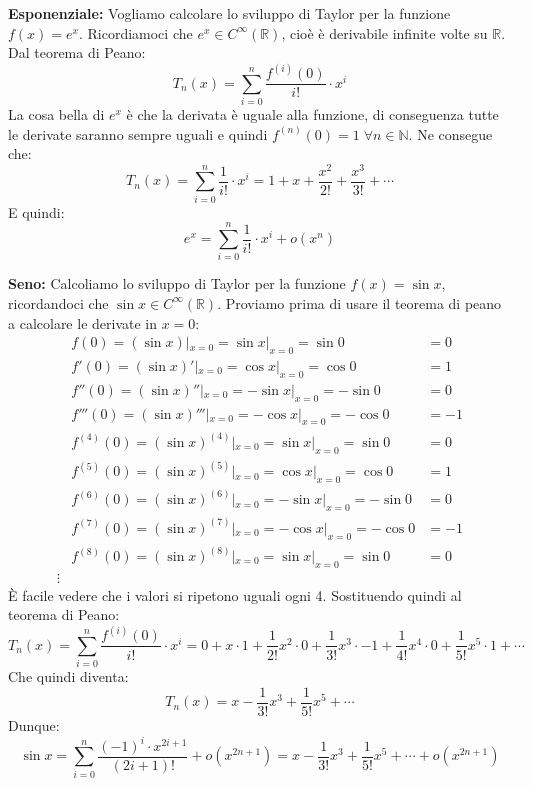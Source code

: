 \textbf{Esponenziale:} Vogliamo calcolare lo sviluppo di Taylor per la funzione $f(x) = e^x$. Ricordiamoci che $e^x \in C^\infty (\mathbb{R})$, cioè è derivabile infinite volte su $\mathbb{R}$. Dal teorema di Peano:
\begin{equation*}
	T_n(x) = \sum \limits_{i = 0}^n \dfrac{f^{(i)}(0)}{i!} \cdot x^i 
\end{equation*}
La cosa bella di $e^x$ è che la derivata è uguale alla funzione, di conseguenza tutte le derivate saranno sempre uguali e quindi $f^{(n)}(0) = 1 \; \forall n \in \mathbb{N}$. Ne consegue che:
\begin{equation*}
	T_n(x) = \sum \limits_{i = 0}^n \dfrac{1}{i!} \cdot x^i = 1 + x + \dfrac{x^2}{2!} + \dfrac{x^3}{3!} + \cdots
\end{equation*}
E quindi:
\begin{equation*}
	e^x = \sum \limits_{i = 0}^n \dfrac{1}{i!} \cdot x^i + o(x^n)
\end{equation*}


\textbf{Seno:} Calcoliamo lo sviluppo di Taylor per la funzione $f(x) = \sin{x}$, ricordandoci che $\sin{x} \in C^\infty (\mathbb{R})$. Proviamo prima di usare il teorema di peano a calcolare le derivate in $x = 0$:
\begin{align*}
	&f(0) = (\sin{x}) |_{x = 0} = \sin{x} |_{x = 0} = \sin{0} &= 0\\[5pt]
	&f'(0) = (\sin{x})' |_{x = 0} = \cos{x} |_{x = 0} = \cos{0} &= 1\\[5pt]
	&f''(0) = (\sin{x})'' |_{x = 0} = -\sin{x} |_{x = 0} = -\sin{0} &= 0\\[5pt]
	&f'''(0) = (\sin{x})''' |_{x = 0} = -\cos{x} |_{x = 0} = -\cos{0} &= -1\\[5pt]
	&f^{(4)}(0) = (\sin{x})^{(4)} |_{x = 0} = \sin{x} |_{x = 0} = \sin{0} &= 0\\[5pt]
	&f^{(5)}(0) = (\sin{x})^{(5)} |_{x = 0} = \cos{x} |_{x = 0} = \cos{0} &= 1\\[5pt]
	&f^{(6)}(0) = (\sin{x})^{(6)}|_{x = 0} = -\sin{x} |_{x = 0} = -\sin{0} &= 0\\[5pt]
	&f^{(7)}(0) = (\sin{x})^{(7)} |_{x = 0} = -\cos{x} |_{x = 0} = -\cos{0} &= -1\\[5pt]
	&f^{(8)}(0) = (\sin{x})^{(8)} |_{x = 0} = \sin{x} |_{x = 0} = \sin{0} &= 0\\
	\vdots
\end{align*}
È facile vedere che i valori si ripetono uguali ogni 4. Sostituendo quindi al teorema di Peano:
\begin{equation*}
	T_n(x) = \sum \limits_{i = 0}^n \dfrac{f^{(i)}(0)}{i!} \cdot x^i = 0 + x \cdot 1 + \dfrac{1}{2!}x^2 \cdot 0 + \dfrac{1}{3!}x^3 \cdot -1 + \dfrac{1}{4!}x^4 \cdot 0 + \dfrac{1}{5!}x^5 \cdot 1 + \cdots 
\end{equation*}
Che quindi diventa:
\begin{equation*}
	T_n(x) = x - \dfrac{1}{3!}x^3 + \dfrac{1}{5!}x^5 + \cdots
\end{equation*}
Dunque:
\begin{equation*}
	\sin{x} = \sum \limits_{i = 0}^n \dfrac{(-1)^i \cdot x^{2i + 1}}{(2i+1)!} + o(x^{2n +1})= x - \dfrac{1}{3!}x^3 + \dfrac{1}{5!}x^5 + \cdots + o(x^{2n + 1})
\end{equation*}

